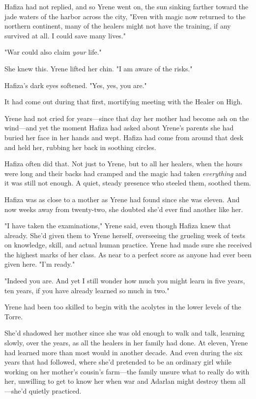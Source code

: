 Hafiza had not replied, and so Yrene went on, the sun sinking farther toward the jade waters of the harbor across the city, "Even with magic now returned to the northern continent, many of the healers might not have the training, if any survived at all. I could save many lives."

"War could also claim \emph{your} life."

She knew this. Yrene lifted her chin. "I am aware of the risks."

Hafiza's dark eyes softened. "Yes, yes, you are."

It had come out during that first, mortifying meeting with the Healer on High.

Yrene had not cried for years---since that day her mother had become ash on the wind---and yet the moment Hafiza had asked about Yrene's parents she had buried her face in her hands and wept. Hafiza had come from around that desk and held her, rubbing her back in soothing circles.

Hafiza often did that. Not just to Yrene, but to all her healers, when the hours were long and their backs had cramped and the magic had taken \emph{everything} and it was still not enough. A quiet, steady presence who steeled them, soothed them.

Hafiza was as close to a mother as Yrene had found since she was eleven. And now weeks away from twenty-two, she doubted she'd ever find another like her.

"I have taken the examinations," Yrene said, even though Hafiza knew that already. She'd given them to Yrene herself, overseeing the grueling week of tests on knowledge, skill, and actual human practice. Yrene had made sure she received the highest marks of her class. As near to a perfect score as anyone had ever been given here. "I'm ready."

"Indeed you are. And yet I still wonder how much you might learn in five years, ten years, if you have already learned so much in two."

Yrene had been too skilled to begin with the acolytes in the lower levels of the Torre.

She'd shadowed her mother since she was old enough to walk and talk, learning slowly, over the years, as all the healers in her family had done. At eleven, Yrene had learned more than most would in another decade. And even during the six years that had followed, where she'd pretended to be an ordinary girl while working on her mother's cousin's farm---the family unsure what to really do with her, unwilling to get to know her when war and Adarlan might destroy them all---she'd quietly practiced.

